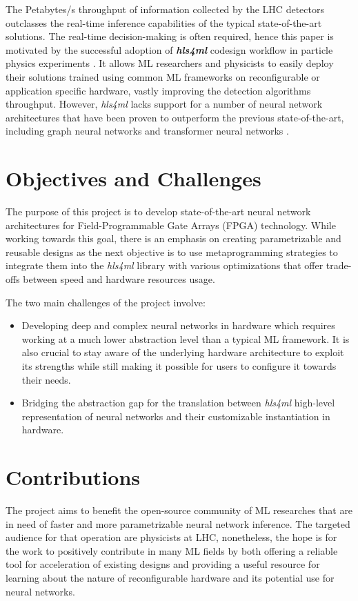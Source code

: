 The Petabytes/s throughput of information collected by the LHC detectors outclasses the real-time inference capabilities of the typical state-of-the-art solutions. The real-time decision-making is often required, hence this paper is motivated by the successful adoption of  \textit{\textbf{hls4ml}} codesign workflow in particle physics experiments \cite{8-fahim2021hls4ml:}. It allows ML researchers and physicists to easily deploy their solutions trained using common ML frameworks on reconfigurable or application specific hardware, vastly improving the detection algorithms throughput. However, \textit{hls4ml} lacks support for a number of neural network architectures that have been proven to outperform the previous state-of-the-art, including graph neural networks \cite{9-newman2019jedi-net:, 11-elabd2021graph} and transformer neural networks \cite{3-yuan2021constituentnet:}.


\section{Objectives and Challenges}
The purpose of this project is to develop state-of-the-art neural network architectures for Field-Programmable Gate Arrays (FPGA) technology. While working towards this goal, there is an emphasis on creating parametrizable and reusable designs as the next objective is to use metaprogramming strategies to integrate them into the \textit{hls4ml} library with various optimizations that offer trade-offs between speed and hardware resources usage.

The two main challenges of the project involve:
\begin{itemize}
  \item Developing deep and complex neural networks in hardware which requires working at a much lower abstraction level than a typical ML framework. It is also crucial to stay aware of the underlying hardware architecture to exploit its strengths while still making it possible for users to configure it towards their needs.
  \item Bridging the abstraction gap for the translation between \textit{hls4ml} high-level representation of neural networks and their customizable instantiation in hardware.
\end{itemize}


\section{Contributions}
The project aims to benefit the open-source community of ML researches that are in need of faster and more parametrizable neural network inference. The targeted audience for that operation are physicists at LHC, nonetheless, the hope is for the work to positively contribute in many ML fields by both offering a reliable tool for acceleration of existing designs and providing a useful resource for learning about the nature of reconfigurable hardware and its potential use for neural networks.

